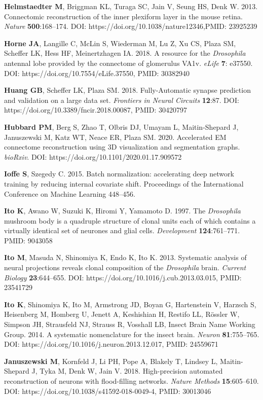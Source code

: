 \documentclass{article}
\begin{document}
\begin{hangpars}
\textbf{Helmstaedter M}, Briggman KL, Turaga SC, Jain V, Seung HS, Denk W. 2013. Connectomic reconstruction of the inner plexiform layer in the mouse retina. \emph{Nature} \textbf{500}:168–174. DOI: https://doi.org/10.1038/nature12346,PMID: 23925239

\textbf{Horne JA}, Langille C, McLin S, Wiederman M, Lu Z, Xu CS, Plaza SM, Scheffer LK, Hess HF, Meinertzhagen IA. 2018. A resource for the \emph{Drosophila} antennal lobe provided by the connectome of glomerulus VA1v. \emph{eLife} \textbf{7}: e37550. DOI: https://doi.org/10.7554/eLife.37550, PMID: 30382940

\textbf{Huang GB}, Scheffer LK, Plaza SM. 2018. Fully-Automatic synapse prediction and validation on a large data set. \emph{Frontiers in Neural Circuits} \textbf{12}:87. DOI: https://doi.org/10.3389/fncir.2018.00087, PMID: 30420797

\textbf{Hubbard PM}, Berg S, Zhao T, Olbris DJ, Umayam L, Maitin-Shepard J, Januszewski M, Katz WT, Neace ER, Plaza SM. 2020. Accelerated EM connectome reconstruction using 3D visualization and segmentation graphs. \emph{bioRxiv}. DOI: https://doi.org/10.1101/2020.01.17.909572

\textbf{Ioffe S}, Szegedy C. 2015. Batch normalization: accelerating deep network training by reducing internal covariate shift. Proceedings of the International Conference on Machine Learning 448–456.

\textbf{Ito K}, Awano W, Suzuki K, Hiromi Y, Yamamoto D. 1997. The \emph{Drosophila} mushroom body is a quadruple structure of clonal units each of which contains a virtually identical set of neurones and glial cells. \emph{Development} \textbf{124}:761–771. PMID: 9043058

\textbf{Ito M}, Masuda N, Shinomiya K, Endo K, Ito K. 2013. Systematic analysis of neural projections reveals clonal composition of the \emph{Drosophila} brain. \emph{Current Biology} \textbf{23}:644–655. DOI: https://doi.org/10.1016/j.cub.2013.03.015, PMID: 23541729

\textbf{Ito K}, Shinomiya K, Ito M, Armstrong JD, Boyan G, Hartenstein V, Harzsch S, Heisenberg M, Homberg U, Jenett A, Keshishian H, Restifo LL, Rössler W, Simpson JH, Strausfeld NJ, Strauss R, Vosshall LB, Insect Brain Name Working Group. 2014. A systematic nomenclature for the insect brain. \emph{Neuron} \textbf{81}:755–765. DOI: https://doi.org/10.1016/j.neuron.2013.12.017, PMID: 24559671

\textbf{Januszewski M}, Kornfeld J, Li PH, Pope A, Blakely T, Lindsey L, Maitin-Shepard J, Tyka M, Denk W, Jain V. 2018. High-precision automated reconstruction of neurons with flood-filling networks. \emph{Nature Methods} \textbf{15}:605–610. DOI: https://doi.org/10.1038/s41592-018-0049-4, PMID: 30013046


\end{hangpars}
\end{document}
